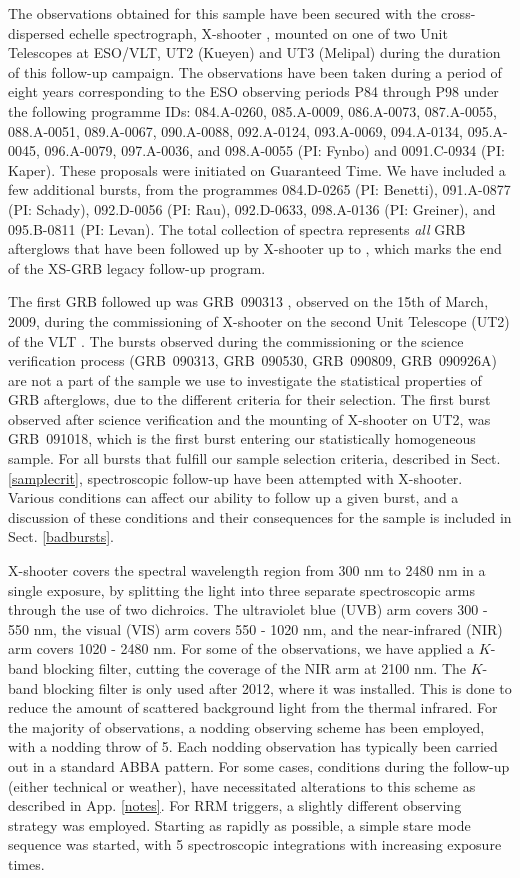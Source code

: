 \documentclass[longauth]{aa}    %
\begin{document}
The observations obtained for this sample have been secured with the
cross-dispersed echelle spectrograph, X-shooter \citep{Vernet2011}, mounted on
one of two Unit Telescopes at ESO/VLT, UT2 (Kueyen) and UT3 (Melipal) during the
duration of this follow-up campaign. The observations have been taken during a
period of eight years corresponding to the ESO observing periods P84 through P98
under the following programme IDs: 084.A-0260, 085.A-0009, 086.A-0073,
087.A-0055, 088.A-0051, 089.A-0067, 090.A-0088, 092.A-0124, 093.A-0069,
094.A-0134, 095.A-0045, 096.A-0079, 097.A-0036, and 098.A-0055 (PI: Fynbo) and
0091.C-0934 (PI: Kaper). These proposals were initiated on Guaranteed Time. We
have included a few additional bursts, from the programmes 084.D-0265 (PI:
Benetti), 091.A-0877 (PI: Schady), 092.D-0056 (PI: Rau), 092.D-0633,
098.A-0136 (PI: Greiner), and 095.B-0811 (PI: Levan). The total collection of
spectra represents \textit{all} GRB afterglows that have been followed up by
X-shooter up to \termdate, which marks the end of the XS-GRB legacy follow-up
program.

The first GRB followed up was GRB~090313 \citep{DeUgartePostigo2010}, observed
on the 15th of March, 2009, during the commissioning of X-shooter on the second
Unit Telescope (UT2) of the VLT . The bursts observed during the commissioning
or the science verification process (GRB~090313, GRB~090530, GRB~090809,
GRB~090926A) are not a part of the sample we use to investigate the statistical
properties of GRB afterglows, due to the different criteria for their selection. The
first burst observed after science verification and the mounting of X-shooter on UT2,
was GRB~091018, which is the first burst entering our statistically homogeneous
sample. For all bursts that fulfill our sample selection criteria, described in
Sect. \ref{samplecrit}, spectroscopic follow-up have been attempted with
X-shooter. Various conditions can affect our ability to follow up a given burst,
and a discussion of these conditions and their consequences for the sample is
included in Sect. \ref{badbursts}.

X-shooter covers the spectral wavelength region from 300 nm to 2480 nm in a
single exposure, by splitting the light into three separate spectroscopic arms
through the use of two dichroics. The ultraviolet blue (UVB) arm covers 300 -
550 nm, the visual (VIS) arm covers 550 - 1020 nm, and the near-infrared (NIR)
arm covers 1020 - 2480 nm. For some of the observations, we have applied a
$K$-band blocking filter, cutting the coverage of the NIR arm at 2100 nm. The
$K$-band blocking filter is only used after 2012, where it was installed. This
is done to reduce the amount of scattered background light from the thermal
infrared. For the majority of observations, a nodding observing scheme
has been employed, with a nodding throw of 5\arcsec. Each nodding observation
has typically been carried out in a standard ABBA pattern. For some cases,
conditions during the follow-up (either technical or weather), have necessitated
alterations to this scheme as described in App. \ref{notes}. For RRM triggers, a
slightly different observing strategy was employed. Starting as rapidly as
possible, a simple stare mode sequence was started, with 5 spectroscopic
integrations with increasing exposure times.
\end{document}
